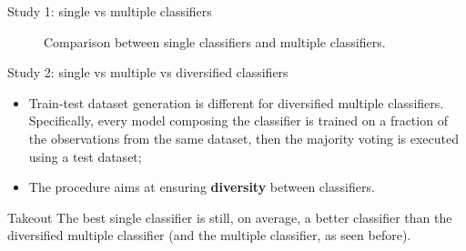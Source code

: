 \documentclass[12pt]{beamer}
\begin{document}
\begin{frame}{Study 1: single vs multiple classifiers}
  \begin{figure}
    \centering
    \hfill
    \hfill
    \caption{Comparison between single classifiers and multiple classifiers.}
\end{figure}
\end{frame}



\begin{frame}{Study 2: single vs multiple vs diversified classifiers}
  \begin{itemize}
    \item Train-test dataset generation is different for diversified multiple classifiers.
      Specifically, every model composing
      the classifier is trained on a fraction of the observations from the same
      dataset, then the majority
      voting is executed using a test dataset;
    \item The procedure aims at ensuring \textbf{diversity} between classifiers.
  \end{itemize}

  \begin{block}{Takeout}
    The best single classifier is still, on average, a better classifier than
    the diversified multiple classifier (and the multiple classifier, as seen before).
  \end{block}

\end{frame}
\end{document}
